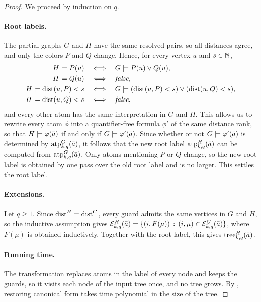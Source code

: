 \begin{proof}
We proceed by induction on $q$.

\paragraph{Root labels.}
The partial graphs $G$ and $H$ have the same resolved pairs, so all distances agree, and only the colors $P$ and $Q$ change.
Hence, for every vertex $u$ and $s\in\mathbb N$,
\begin{align*}
H\models P(u)&\quad\Longleftrightarrow\quad G\models P(u)\lor Q(u),\\
H\models Q(u)&\quad\Longleftrightarrow\quad\textit{false},\\
H\models\mathrm{dist}(u,P)<s&\quad\Longleftrightarrow\quad G\models(\mathrm{dist}(u,P)<s)\lor(\mathrm{dist}(u,Q)<s),\\
H\models\mathrm{dist}(u,Q)<s&\quad\Longleftrightarrow\quad\textit{false},
\end{align*}
and every other atom has the same interpretation in $G$ and $H$.
This allows us to rewrite every atom \(\phi\) 
into a quantifier-free formula \(\phi'\)
of the same distance rank, so that 
$H\models\varphi(\bar a)$ if and only if $G\models\varphi'(\bar a)$.
Since whether or not $G\models\varphi'(\bar a)$ is determined by $\textnormal{atp}^G_{k,q}(\bar a)$, it follows that the new root label $\textnormal{atp}^{H}_{k,q}(\bar a)$ can be computed  from $\textnormal{atp}^G_{k,q}(\bar a)$.
Only atoms mentioning $P$ or $Q$ change, so the new root label is obtained by one pass over the old root label and is no larger.
This settles the root label.

\paragraph{Extensions.}
Let $q\ge1$.
Since $\mathrm{dist}^{H}=\mathrm{dist}^G$, every guard admits the same vertices in $G$ and $H$, so the inductive assumption gives $\mathcal E^{H}_{k,q}(\bar a)=\{(i,F(\mu)) \,:\, (i,\mu)\in\mathcal E^G_{k,q}(\bar a) \}$,
where $F(\mu)$ is obtained inductively.
Together with the root label, this gives $\mathrm{tree}^{H}_{k,q}(\bar a)$.


\paragraph{Running time.}
The transformation replaces atoms in the label of every node and keeps the guards, so it visits each node of the input tree once, and no tree grows.
By , restoring canonical form takes time polynomial  in the size of the tree.
\end{proof}

